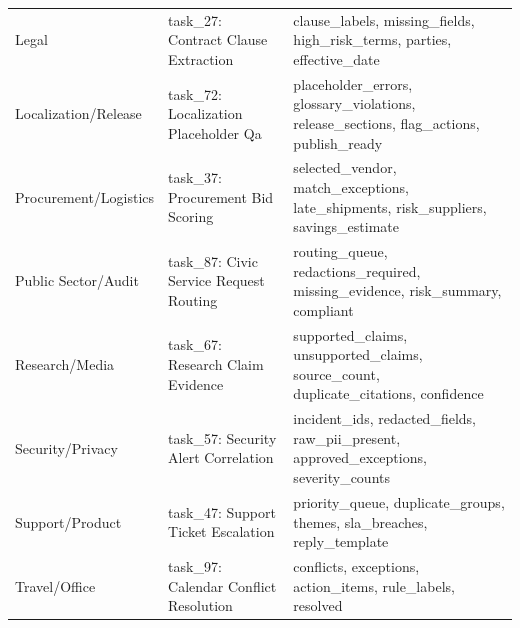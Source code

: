 \documentclass[11pt]{article}
\begin{document}
\begin{longtable}{L{0.20\textwidth}L{0.23\textwidth}L{0.47\textwidth}}
Legal & task\_27: Contract Clause Extraction & clause\_labels, missing\_fields, high\_risk\_terms, parties, effective\_date \\
Localization/Release & task\_72: Localization Placeholder Qa & placeholder\_errors, glossary\_violations, release\_sections, flag\_actions, publish\_ready \\
Procurement/Logistics & task\_37: Procurement Bid Scoring & selected\_vendor, match\_exceptions, late\_shipments, risk\_suppliers, savings\_estimate \\
Public Sector/Audit & task\_87: Civic Service Request Routing & routing\_queue, redactions\_required, missing\_evidence, risk\_summary, compliant \\
Research/Media & task\_67: Research Claim Evidence & supported\_claims, unsupported\_claims, source\_count, duplicate\_citations, confidence \\
Security/Privacy & task\_57: Security Alert Correlation & incident\_ids, redacted\_fields, raw\_pii\_present, approved\_exceptions, severity\_counts \\
Support/Product & task\_47: Support Ticket Escalation & priority\_queue, duplicate\_groups, themes, sla\_breaches, reply\_template \\
Travel/Office & task\_97: Calendar Conflict Resolution & conflicts, exceptions, action\_items, rule\_labels, resolved \\
\bottomrule
\end{longtable}
\endgroup
\end{document}
